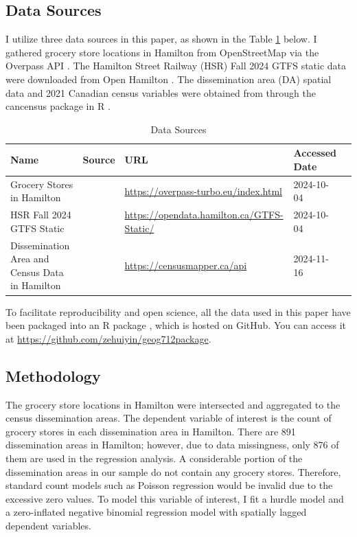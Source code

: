 \documentclass[preprint, 3p,
authoryear]{elsarticle} %
\begin{document}
\subsection{Data Sources}\label{data-sources}

I utilize three data sources in this paper, as shown in the Table
\ref{tab:data_source} below. I gathered grocery store locations in
Hamilton from OpenStreetMap \citep{osm} via the Overpass API
\citep{overpass}. The Hamilton Street Railway (HSR) Fall 2024 GTFS
static data were downloaded from Open Hamilton \citep{hsr_gtfs}. The
dissemination area (DA) spatial data and 2021 Canadian census variables
were obtained from \citet{census} through the cancensus package in R
\citep{cancensus}.

\begin{table}[h]
\centering
\begin{footnotesize}
\begin{tabularx}{\textwidth}{XllXl}
\hline
Name                                           & Source              & URL                                             & Accessed Date \\
\hline
Grocery Stores in Hamilton                     & \cite{osm}          & \url{https://overpass-turbo.eu/index.html}      & 2024-10-04    \\
HSR Fall 2024 GTFS Static                      & \cite{hsr_gtfs}     & \url{https://opendata.hamilton.ca/GTFS-Static/} & 2024-10-04    \\
Dissemination Area and Census Data in Hamilton & \cite{census}       & \url{https://censusmapper.ca/api}               & 2024-11-16    \\
\hline
\end{tabularx}
\caption{\label{tab:data_source}Data Sources}
\end{footnotesize}
\end{table}

To facilitate reproducibility and open science, all the data used in
this paper have been packaged into an R package \citep{geog712package},
which is hosted on GitHub. You can access it at
\url{https://github.com/zehuiyin/geog712package}.

\subsection{Methodology}\label{methodology}

The grocery store locations in Hamilton were intersected and aggregated
to the census dissemination areas. The dependent variable of interest is
the count of grocery stores in each dissemination area in Hamilton.
There are 891 dissemination areas in Hamilton; however, due to data
missingness, only 876 of them are used in the regression analysis. A
considerable portion of the dissemination areas in our sample do not
contain any grocery stores. Therefore, standard count models such as
Poisson regression would be invalid due to the excessive zero values. To
model this variable of interest, I fit a hurdle model and a
zero-inflated negative binomial regression model with spatially lagged
dependent variables.
\end{document}
